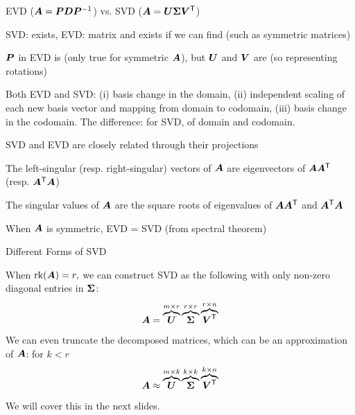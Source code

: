 \documentclass[handout,fleqn,aspectratio=169]{beamer}
\begin{document}
\begin{frame}{EVD ($\bm{A} = \bm{P} \bm{D} {{\bm{P}}^{-1}}$) vs. SVD ($\bm{A} = \bm{U} \bm{\Sigma} {\bm{V}}^{\mathsf{T}}$)}

\plitemsep 0.07in

\bci 
\item SVD:  exists, EVD:  matrix and exists if we can find  (such as symmetric matrices)

\item $\bm{P}$ in EVD is  (only true for symmetric $\bm{A}$), but $\bm{U}$ and $\bm{V}$ are  (so representing rotations)

\item Both EVD and SVD: (i) basis change in the domain, (ii) independent scaling of each new basis vector and mapping from domain to codomain, (iii) basis change in the codomain. The difference: for SVD,  of domain and codomain. 

\item SVD and EVD are closely related through their projections
\bci
\item The left-singular (resp. right-singular) vectors of $\bm{A}$ are eigenvectors of $\bm{A} {\bm{A}}^{\mathsf{T}}$ (resp. ${\bm{A}}^{\mathsf{T}} \bm{A}$)
\item The singular values of $\bm{A}$ are the square roots of eigenvalues of $\bm{A} {\bm{A}}^{\mathsf{T}}$ and ${\bm{A}}^{\mathsf{T}} \bm{A}$
\item When $\bm{A}$ is symmetric, EVD = SVD (from spectral theorem)
\eci
\eci
\end{frame}

\begin{frame}{Different Forms of SVD}

\plitemsep 0.1in

\bci 

\item When $\text{rk}(\bm{A}) = r,$ we can construct SVD as the following with only non-zero diagonal entries in $\bm{\Sigma}$:
$$
\bm{A} = \overbrace{\bm{U}}^{m \times r} \overbrace{\bm{\Sigma} }^{r \times r} \overbrace{{\bm{V}}^{\mathsf{T}}}^{r \times n}
$$

\item We can even truncate the decomposed matrices, which can be an approximation of $\bm{A}$: for $k < r$
$$
\bm{A} \approx \overbrace{\bm{U}}^{m \times k} \overbrace{\bm{\Sigma} }^{k \times k} \overbrace{{\bm{V}}^{\mathsf{T}}}^{k \times n}
$$

\medskip
We will cover this in the next slides.
\eci
\end{frame}
\end{document}
